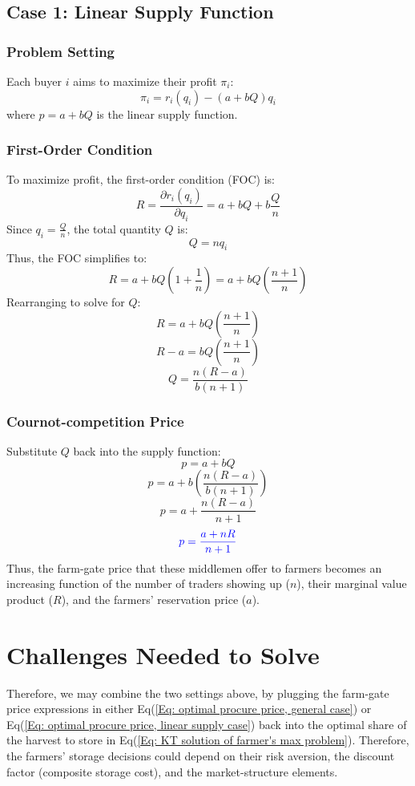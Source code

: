 \documentclass[12pt]{article}
\begin{document}
\subsection{Case 1: Linear Supply Function}

\subsubsection*{Problem Setting}

Each buyer \( i \) aims to maximize their profit \( \pi_i \):
\[
\pi_i = r_i(q_i) - (a + bQ)q_i
\]
where \( p = a + bQ \) is the linear supply function.

\subsubsection*{First-Order Condition}

To maximize profit, the first-order condition (FOC) is:
\[
R = \frac{\partial r_i(q_i)}{\partial q_i} = a + bQ + b \frac{Q}{n}
\]
Since \( q_i = \frac{Q}{n} \), the total quantity \( Q \) is:
\[
Q = nq_i
\]
Thus, the FOC simplifies to:
\[
R = a + bQ \left(1 + \frac{1}{n}\right) = a + bQ \left(\frac{n+1}{n}\right)
\]
Rearranging to solve for \( Q \):
\[
R = a + bQ \left(\frac{n+1}{n}\right)
\]
\[
R - a = bQ \left(\frac{n+1}{n}\right)
\]
\[
Q = \frac{n(R - a)}{b(n+1)}
\]

\subsubsection*{Cournot-competition Price}

Substitute \( Q \) back into the supply function:
\[
p = a + bQ
\]
\[
p = a + b \left( \frac{n(R - a)}{b(n+1)} \right)
\]
\[
p = a + \frac{n(R - a)}{n+1}
\]
\begin{equation}
    \textcolor{blue}{p = \frac{a + nR}{n+1}}
    \label{Eq: optimal procure price, linear supply case}
\end{equation}
Thus, the farm-gate price that these middlemen offer to farmers becomes an increasing function of the number of traders showing up ($n$), their marginal value product ($R$), and the farmers' reservation price ($a$).


\section{Challenges Needed to Solve}
Therefore, we may combine the two settings above, by plugging the farm-gate price expressions in either Eq(\ref{Eq: optimal procure price, general case}) or Eq(\ref{Eq: optimal procure price, linear supply case}) back into the optimal share of the harvest to store in Eq(\ref{Eq: KT solution of farmer's max problem}). Therefore, the farmers' storage decisions could depend on their risk aversion, the discount factor (composite storage cost), and the market-structure elements. 
\end{document}
